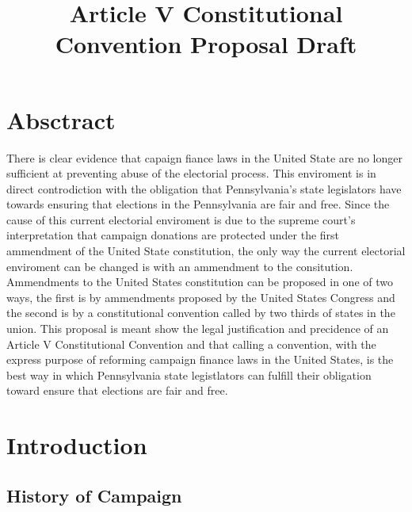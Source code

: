 \documentclass[11pt]{article} %
\title{Article V Constitutional Convention Proposal Draft}
\begin{document}
\maketitle

\section{Absctract}

	There is clear evidence that capaign fiance laws in the United State are no longer sufficient at preventing abuse of the electorial process.  This enviroment is in direct controdiction with the obligation that Pennsylvania's state legislators have towards ensuring that elections in the Pennsylvania are fair and free.   Since the cause of this current electorial enviroment is due to the supreme court's interpretation that campaign donations are protected under the first ammendment of the United State constitution, the only way the current electorial enviroment can be changed is with an ammendment to the consitution.  Ammendments to the United States constitution can be proposed in one of two ways,  the first is by ammendments proposed by the United States Congress and the second is by a constitutional convention called by two thirds of states in the union.   This proposal is meant show the legal justification and precidence of an Article V Constitutional Convention and that calling a convention, with the express purpose of reforming campaign finance laws in the United States, is the best way in which Pennsylvania state legistlators can fulfill their obligation toward ensure that elections are fair and free.  

\section{Introduction}

\subsection{History of Campaign }
\end{document}
